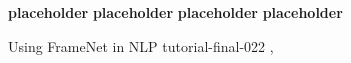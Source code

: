 \begin{bio}
  {\bfseries placeholder}
  {\bfseries placeholder}
  {\bfseries placeholder}
  {\bfseries placeholder}
\end{bio}

\begin{tutorial}
  {Using FrameNet in NLP}
  {tutorial-final-022}
  {\daydateyear, \tutorialafternoontime}
  {\TutLocF}



\end{tutorial} 
